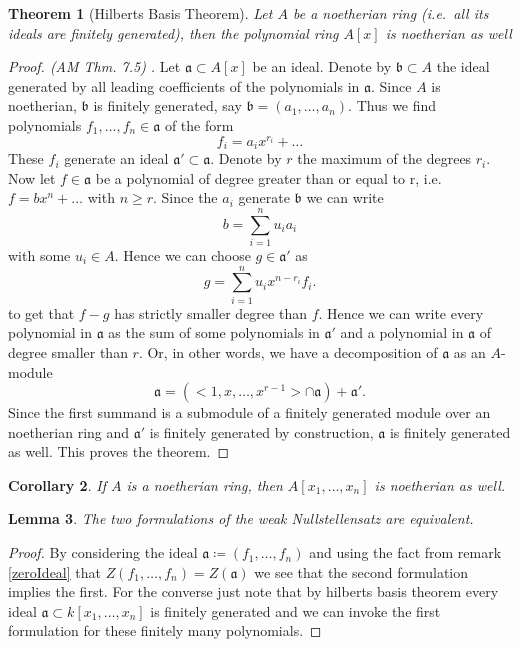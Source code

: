 \documentclass[11pt, a4paper, english, twoside]{article}
\theoremstyle{plain}
\newtheorem{theorem}{Theorem}[section]
\newtheorem{corollary}[theorem]{Corollary}
\newtheorem{lemma}[theorem]{Lemma}
\theoremstyle{definition}
\begin{document}
\begin{theorem}[Hilberts Basis Theorem]
    Let $A$ be a noetherian ring (i.e.\ all its ideals are finitely generated), then the polynomial ring $A[x]$ is noetherian as well
\end{theorem}
\begin{proof}[Proof. (AM Thm. 7.5) ]
    Let $\mathfrak{a} \subset A[x]$ be an ideal. Denote by $\mathfrak{b} \subset A$ the ideal generated by all leading coefficients of the
    polynomials in $\mathfrak{a}$. Since $A$ is noetherian, $\mathfrak{b}$ is finitely generated, say $\mathfrak{b} = (a_1,\dots,a_n)$. Thus
    we find polynomials $f_1,\dots,f_n \in \mathfrak{a}$ of the form 
    \[
        f_i = a_ix^{r_i} + \dots
    \]
    These $f_i$ generate an ideal $\mathfrak{a}' \subset \mathfrak{a}$.
    Denote by $r$ the maximum of the degrees $r_i$. Now let $f \in \mathfrak{a}$ be a polynomial of degree greater than or equal to r, i.e.\ 
    $f = bx^n + \dots$ with $n \ge r$. Since the $a_i$ generate $\mathfrak{b}$ we can write 
    \[
        b = \sum_{i=1}^n u_ia_i 
    \]
    with some $u_i \in A$. Hence we can choose $g \in \mathfrak{a}'$ as 
    \[
        g = \sum_{i=1}^n u_ix^{n-r_i}f_i.
    \]
    to get that $f - g$ has strictly smaller degree than $f$. 
    Hence we can write every polynomial in $\mathfrak{a}$ as the sum of some polynomials in $\mathfrak{a}'$ and
    a polynomial in $\mathfrak{a}$ of degree smaller than $r$. Or, in other words, we have a decomposition of $\mathfrak{a}$ as an $A$-module
    \[
        \mathfrak{a} = ( <1,x,\dots,x^{r-1}> \cap \mathfrak{a} ) + \mathfrak{a}'.
    \]
    Since the first summand is a submodule of a finitely generated module over an noetherian ring and $\mathfrak{a}'$ is finitely generated by
    construction, $\mathfrak{a}$ is finitely generated as well. This proves the theorem.
\end{proof}

\begin{corollary}
    If $A$ is a noetherian ring, then $A[x_1,\dots,x_n]$ is noetherian as well.
\end{corollary}

\begin{lemma}
    The two formulations of the weak Nullstellensatz are equivalent.
\end{lemma}
\begin{proof}
    By considering the ideal $\mathfrak{a} \coloneqq (f_1, \dots, f_n)$ and using the fact from remark \ref{zeroIdeal} that 
    $Z(f_1,\dots,f_n) = Z(\mathfrak{a})$ we see that the second formulation implies the first.
    For the converse just note that by hilberts basis theorem every ideal $\mathfrak{a} \subset k[x_1,\dots,x_n]$ is finitely generated and we
    can invoke the first formulation for these finitely many polynomials.
\end{proof}
\end{document}
